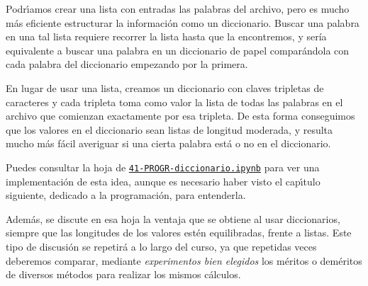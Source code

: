 Podr\'{\i}amos crear una lista con entradas las palabras del archivo, pero es
mucho m\'as eficiente estructurar la informaci\'on como un diccionario.  Buscar
una palabra en una tal lista requiere recorrer la lista hasta que la
encontremos, y ser\'ia equivalente a buscar una palabra en un diccionario de
papel compar\'andola con cada palabra del diccionario empezando por la primera. 



En lugar de usar una lista, 
creamos un diccionario con claves tripletas de caracteres y cada tripleta toma
como valor la lista de todas las palabras en el archivo que comienzan
exactamente por esa tripleta.  De esta forma conseguimos que los valores en el
diccionario sean listas de longitud moderada, y resulta mucho m\'as f\'acil 
averiguar si una cierta palabra est\'a o no en el diccionario. 

\label{diccionario}
Puedes consultar la hoja de {\sage}
\href{http://localhost:8888/notebooks/PROGR/41-PROGR-diccionario.ipynb}{\tt 41-PROGR-diccionario.ipynb} para ver una implementaci\'on de esta idea, 
aunque {\sc es necesario haber visto el cap\'{\i}tulo siguiente}, dedicado a la
programaci\'on, para entenderla. 

Adem\'as, se discute en esa hoja la ventaja que se obtiene al usar diccionarios,
siempre que las longitudes de los valores est\'en equilibradas, frente a listas.
Este tipo de discusi\'on se repetir\'a a lo largo del curso, ya que repetidas
veces deberemos comparar, mediante {\itshape experimentos bien elegidos} los
m\'eritos o dem\'eritos de diversos m\'etodos para realizar los mismos
c\'alculos.
                                                                    






